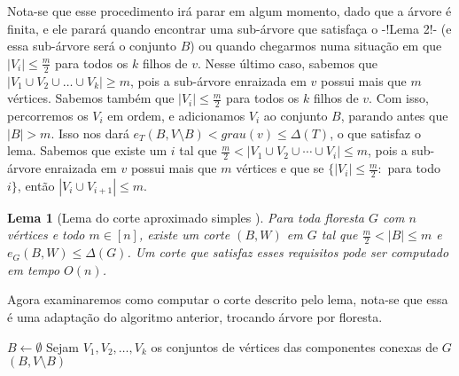 \documentclass[a4paper,12pt]{article}
\newtheorem{lem}{Lema}
\begin{document}
	Nota-se que esse procedimento irá parar em algum momento, dado que a árvore 
	é finita, e ele parará quando encontrar
	uma sub-árvore que satisfaça o -!Lema 2!- (e essa sub-árvore será o conjunto $B$) 
	ou quando chegarmos numa situação em que  
	$|V_i|\le \frac{m}{2}$ para todos os $k$ filhos de $v$.
	Nesse último caso, sabemos que $|V_1\cup V_2\cup \ldots \cup V_k|\ge m$, pois
	a sub-árvore enraizada em $v$ possui mais que $m$ vértices. 
	Sabemos também que $|V_i|\le \frac{m}{2}$ para todos os $k$ filhos de $v$. 
	Com isso, percorremos os $V_i$ em ordem, e 
	adicionamos $V_i$ ao conjunto $B$, parando antes que $|B| > m$. Isso nos dará
	$e_T(B,V\setminus B) < grau(v) \le \Delta(T)$, o que satisfaz o lema.
	Sabemos que existe um $i$ tal que 
	$\frac{m}{2} < |V_1 \cup V_2 \cup \cdots \cup V_i| \le m$, pois a sub-árvore
	enraizada em $v$ possui mais que $m$ vértices e que se 
	$\{|V_i|\le \frac{m}{2}:$ para todo $i\}$,
	então $|V_i \cup V_{i+1}| \le m$.


\bigskip
\bigskip
\bigskip
\bigskip
\bigskip
\bigskip
\bigskip
\bigskip

\begin{lem}[Lema do corte aproximado simples {\cite[Lemma 2]{Schmidt15}}]

	Para toda floresta $G$ com $n$ vértices e todo $m \in [n]$,
	existe um corte $(B,W)$ em $G$ tal que 
	$\frac{m}{2} <|B| \le m$ e
	$e_G(B,W) \le \Delta(G)$.
	Um corte que satisfaz esses requisitos pode ser computado em
	tempo $O(n)$.
\end{lem}

\medskip

Agora examinaremos como computar o corte descrito pelo lema,
nota-se que essa é uma adaptação do algoritmo anterior, 
trocando árvore por floresta.

\medskip
\medskip

\begin{algorithm}[H]

	\caption{Computa corte aproximado simples em uma floresta}
	$B \gets \emptyset$\;
	Sejam $V_1, V_2,\ldots, V_k$ os conjuntos de vértices das
	componentes conexas de $G$\;
	\Return $(B,V\setminus B)$\;

\end{algorithm}	
\end{document}
